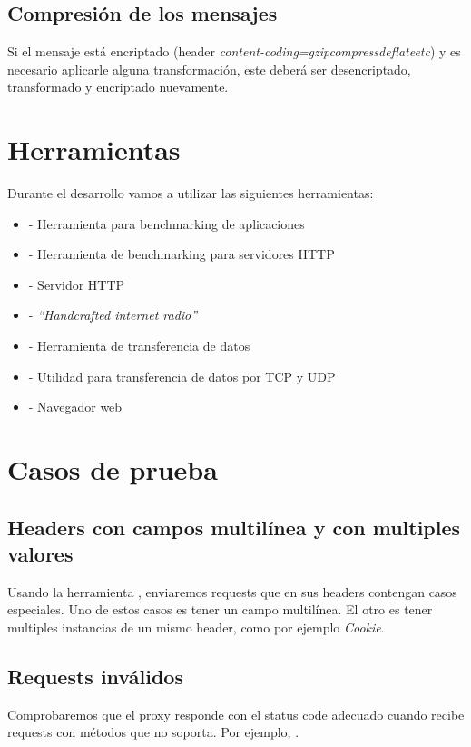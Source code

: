 \documentclass[11pt,a4paper,titlepage]{article}
\begin{document}
\subsection{Compresión de los mensajes}
Si el mensaje está encriptado (header \textit{content-coding=gzip\textpipe compress\textpipe deflate\textpipe etc})
y es necesario aplicarle alguna transformación, este deberá ser desencriptado, transformado y encriptado nuevamente.

\section{Herramientas}
    Durante el desarrollo vamos a utilizar las siguientes herramientas:
    \begin{itemize}
        \item {} - Herramienta para benchmarking de aplicaciones
        \item {} - Herramienta de benchmarking para servidores HTTP
        \item {} - Servidor HTTP
        \item {} - \emph{``Handcrafted internet radio''}
        \item {} - Herramienta de transferencia de datos
        \item {} - Utilidad para transferencia de datos por TCP y UDP
        \item {} - Navegador web
    \end{itemize}

\section{Casos de prueba}
\subsection{Headers con campos multilínea y con multiples valores}
Usando la herramienta , enviaremos requests que en sus headers contengan casos especiales.
Uno de estos casos es tener un campo multilínea.
El otro es tener multiples instancias de un mismo header, como por ejemplo \textit{Cookie}.

\subsection{Requests inválidos}
Comprobaremos que el proxy responde con el status code adecuado cuando recibe requests con métodos que no soporta.
Por ejemplo, .
\end{document}
